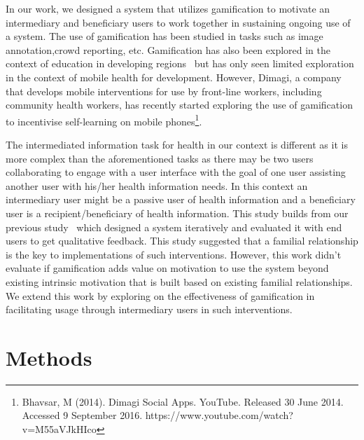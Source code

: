\documentclass{sig-alternate}
\begin{document}
In our work, we designed a system that  utilizes gamification to motivate an intermediary and beneficiary users to work together in sustaining ongoing use of a system. The use of gamification has been studied in tasks such as image annotation\cite{mekler2013:disassembling},crowd reporting\cite{crowley2012:gamification}, etc. Gamification has also been explored in the context of education in developing regions~\cite{kam2008designing,botha2015icts} but has only seen limited exploration in the context of mobile health for development.  However, Dimagi, a company that develops mobile interventions for use by front-line workers, including community health workers, has recently started exploring the use of gamification to incentivise self-learning on mobile phones\footnote{Bhavsar, M (2014). Dimagi Social Apps. YouTube. Released 30 June 2014. Accessed 9 September 2016. https://www.youtube.com/watch?v=M55aVJkHIco}.

The intermediated information task for health in our context is different as it is more complex than the aforementioned tasks as there may be two users collaborating to engage with a user interface with the goal of one user assisting another user with his/her health information needs. In this context an intermediary  user might be a passive user of health information and a beneficiary user is a recipient/beneficiary of health information. This study builds from our previous study~\cite{katule2016:leveraging} which designed a system iteratively and evaluated it with end users to get qualitative feedback. This study suggested that a familial relationship is the key to implementations of such interventions. However, this work didn't evaluate if gamification adds value on motivation to use the system beyond existing intrinsic motivation that is built based on existing familial relationships. We extend this work by exploring on the effectiveness of gamification in facilitating usage through intermediary users in such interventions.
\section{Methods}
\end{document}
